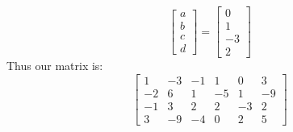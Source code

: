 \documentclass[answers,12pt,addpoints]{exam}
\begin{document}
\begin{questions}
\begin{solution}
$$\begin{bmatrix}
            a\\
            b\\
            c\\
            d
        \end{bmatrix} = \begin{bmatrix}
            0\\
            1\\
            -3\\
            2
        \end{bmatrix}$$
        Thus our matrix is:
    $$ \begin{bmatrix}
        1 & -3 & -1 & 1 & 0 & 3\\
        -2 & 6 & 1 & -5 & 1 & -9\\
        -1 & 3 & 2 & 2 & -3 & 2\\
        3 & -9 & -4 & 0 & 2 & 5
    \end{bmatrix}$$
    \end{solution}
    

\end{questions}
\end{document}
